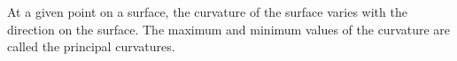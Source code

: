At a given point on a surface, the curvature of the surface varies with
the direction on the surface. The maximum and minimum values of the curvature
are called the principal curvatures.